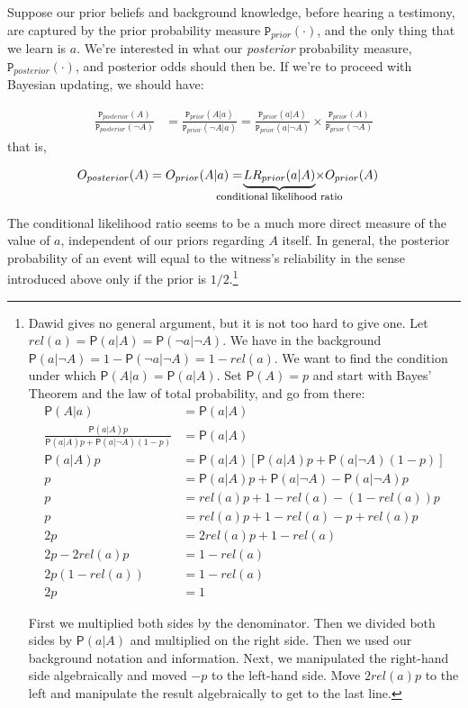 \documentclass[
  10pt,
  dvipsnames,enabledeprecatedfontcommands]{scrartcl}
\newcommand{\n}{\neg}
\newcommand{\pr}[1]{\mathsf{P}(#1)}
\newcommand{\prr}[1]{\mbox{$\mathtt{P}_{prior}(#1)$}}
\newcommand{\prp}[1]{\mbox{$\mathtt{P}_{posterior}(#1)$}}
\begin{document}
Suppose our prior beliefs and background knowledge, before hearing a
testimony, are captured by the prior probability measure
\(\prr{\cdot}\), and the only thing that we learn is \(a\). We're
interested in what our \emph{posterior} probability measure,
\(\prp{\cdot}\), and posterior odds should then be. If we're to proceed
with Bayesian updating, we should have:

\vspace{-6mm}

\begin{align*}
 \frac{\prp{A}}{\prp{\n A}} & = \frac{\prr{A\vert a}}{\prr{\n A\vert a}}
 =
 \frac{\prr{a\vert A}}{\prr{a\vert \n A}}
 \times
 \frac{\prr{A}}{\prr{\n A}}
  \end{align*} that is,

\vspace{-6mm}

\begin{align}
 \label{bayesodss2}
 O_{posterior}(A)& = O_{prior}(A\vert a) = \!\!\!\!\!  \!\!\!\!\!  \!\! \!\!  \underbrace{LR_{prior}(a\vert A)}_{\mbox{\footnotesize conditional likelihood ratio}}  \!\!\!\!\!   \!\!\!\!\!  \!\! \!\!   \times  O_{prior}(A)
 \end{align}

The conditional likelihood ratio seems to be a much more direct measure
of the value of \(a\), independent of our priors regarding \(A\) itself.
In general, the posterior probability of an event will equal to the
witness's reliability in the sense introduced above only if the prior is
\(1/2\).\footnote{Dawid gives no general argument, but it is not too hard to  give one. Let $rel(a)=\pr{a\vert A}=\pr{\n a\vert \n A}$. We have in the background $\pr{a\vert \n A}=1-\pr{\n a\vert \n A}=1-rel(a)$.
 We want to find the condition under which $\pr{A\vert a} = \pr{a\vert A}$. Set $\pr{A}=p$ and  start with Bayes' Theorem and the law of total probability, and go from there:
 \begin{align*}
 \pr{A\vert a}& = \pr{a\vert A}\\
 \frac{\pr{a\vert A}p}{\pr{a\vert A}p+\pr{a\vert \n A}(1-p)} &= \pr{a\vert A} \\
 \pr{a\vert A}p & = \pr{a\vert A}[\pr{a\vert A}p+\pr{a\vert \n A}(1-p)]\\
 p & = \pr{a\vert A}p + \pr{a\vert \n A} - \pr{a\vert \n A}p\\
 p &= rel(a) p + 1-rel(a)- (1-rel(a))p\\
 p & = rel(a)p +1 - rel(a) -p +rel(a)p \\
 2p & =  2rel(a)p + 1 - rel(a)  \\
 2p - 2 rel(a)p & = 1-rel(a)\\
 2p(1-rel(a)) &= 1-rel(a)\\
 2p & = 1
 \end{align*}

\noindent  First we multiplied both sides by the denominator. Then we divided both sides by $\pr{a\vert A}$ and multiplied on the right side. Then we used our background notation and information. Next, we manipulated the right-hand side algebraically and  moved  $-p$ to the left-hand side. Move $2rel(a)p$ to the left and manipulate the result algebraically to get to the last line.}
\end{document}

